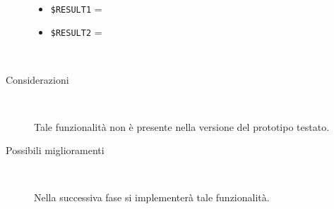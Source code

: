 \documentclass[../../Sperimentazione.tex]{subfiles}
\begin{document}
\begin{tcolorbox}[fonttitle=\bfseries, 
								adjusted title={\Large Prova 3A.1}, 
								breakable, 
								sharp corners=south,
								colback=white, 
								colframe=white!60!black]
\begin{description}[leftmargin=0.7cm,labelwidth=!]
\begin{description}
        					\item[\dispositivoB] \ \par
        					\begin{itemize}
        						\item \verb|$RESULT1| = \ns
        						\item \verb|$RESULT2| = \ns
        					\end{itemize}
        					
        				\end{description}
        				
        			\tcbline
        			
        			\item[Analisi risultati] \ \par
        				\begin{description}
        					\item[Considerazioni] \ \par
        						Tale funzionalità non è presente nella versione del prototipo testato.
        					
        					\item[Possibili miglioramenti] \ \par 
        						Nella successiva fase si implementerà tale funzionalità.
        				\end{description}
        				
				\end{description}  
				
			\end{tcolorbox}



	
	\newpage	
\end{document}
